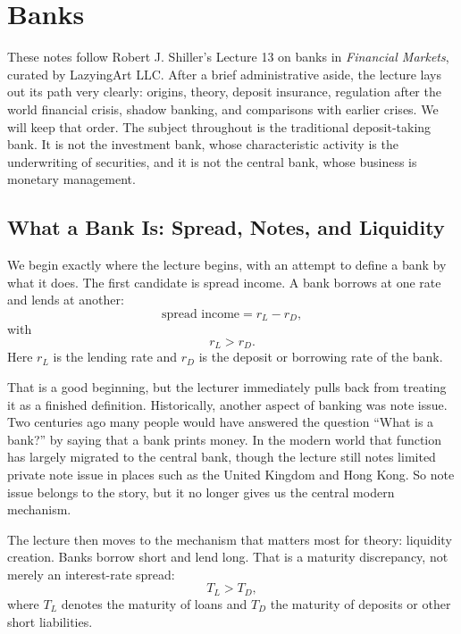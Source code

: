 \chapter{Banks}

These notes follow Robert J. Shiller's Lecture 13 on banks in \textit{Financial Markets}, curated by LazyingArt LLC. After a brief administrative aside, the lecture lays out its path very clearly: origins, theory, deposit insurance, regulation after the world financial crisis, shadow banking, and comparisons with earlier crises. We will keep that order. The subject throughout is the traditional deposit-taking bank. It is not the investment bank, whose characteristic activity is the underwriting of securities, and it is not the central bank, whose business is monetary management.

\section{What a Bank Is: Spread, Notes, and Liquidity}

We begin exactly where the lecture begins, with an attempt to define a bank by what it does. The first candidate is spread income. A bank borrows at one rate and lends at another:
\begin{equation}
\text{spread income} = r_L - r_D,
\end{equation}
with
\begin{equation}
r_L > r_D.
\end{equation}
Here \(r_L\) is the lending rate and \(r_D\) is the deposit or borrowing rate of the bank.

That is a good beginning, but the lecturer immediately pulls back from treating it as a finished definition. Historically, another aspect of banking was note issue. Two centuries ago many people would have answered the question ``What is a bank?'' by saying that a bank prints money. In the modern world that function has largely migrated to the central bank, though the lecture still notes limited private note issue in places such as the United Kingdom and Hong Kong. So note issue belongs to the story, but it no longer gives us the central modern mechanism.

The lecture then moves to the mechanism that matters most for theory: liquidity creation. Banks borrow short and lend long. That is a maturity discrepancy, not merely an interest-rate spread:
\begin{equation}
T_L > T_D,
\end{equation}
where \(T_L\) denotes the maturity of loans and \(T_D\) the maturity of deposits or other short liabilities.

